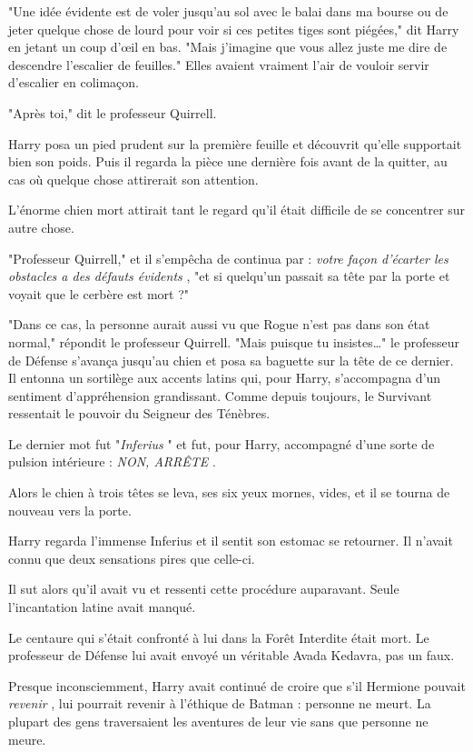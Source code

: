 "Une idée évidente est de voler jusqu'au sol avec le balai dans ma bourse ou de jeter quelque chose de lourd pour voir si ces petites tiges sont piégées," dit Harry en jetant un coup d'œil en bas. "Mais j'imagine que vous allez juste me dire de descendre l'escalier de feuilles." Elles avaient vraiment l'air de vouloir servir d'escalier en colimaçon.

"Après toi," dit le professeur Quirrell.

Harry posa un pied prudent sur la première feuille et découvrit qu'elle supportait bien son poids. Puis il regarda la pièce une dernière fois avant de la quitter, au cas où quelque chose attirerait son attention.

L'énorme chien mort attirait tant le regard qu'il était difficile de se concentrer sur autre chose.

"Professeur Quirrell," et il s'empêcha de continua par : \emph{votre façon d'écarter les obstacles a des défauts évidents} , "et si quelqu'un passait sa tête par la porte et voyait que le cerbère est mort ?"

"Dans ce cas, la personne aurait aussi vu que Rogue n'est pas dans son état normal," répondit le professeur Quirrell. "Mais puisque tu insistes…" le professeur de Défense s'avança jusqu'au chien et posa sa baguette sur la tête de ce dernier. Il entonna un sortilège aux accents latins qui, pour Harry, s'accompagna d'un sentiment d'appréhension grandissant. Comme depuis toujours, le Survivant ressentait le pouvoir du Seigneur des Ténèbres.

Le dernier mot fut "\emph{Inferius} " et fut, pour Harry, accompagné d'une sorte de pulsion intérieure : \emph{NON, ARRÊTE} .

Alors le chien à trois têtes se leva, ses six yeux mornes, vides, et il se tourna de nouveau vers la porte.

Harry regarda l'immense Inferius et il sentit son estomac se retourner. Il n'avait connu que deux sensations pires que celle-ci.

Il sut alors qu'il avait vu et ressenti cette procédure auparavant. Seule l'incantation latine avait manqué.

Le centaure qui s'était confronté à lui dans la Forêt Interdite était mort. Le professeur de Défense lui avait envoyé un véritable Avada Kedavra, pas un faux.

Presque inconsciemment, Harry avait continué de croire que s'il Hermione pouvait \emph{revenir} , lui pourrait revenir à l'éthique de Batman : personne ne meurt. La plupart des gens traversaient les aventures de leur vie sans que personne ne meure.

